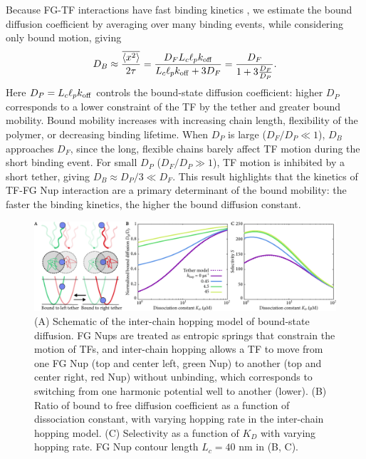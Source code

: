 Because FG-TF interactions have fast binding kinetics \cite{milles15,
  hough15}, we estimate the bound diffusion coefficient by averaging
over many binding events, while considering only bound motion, giving
\begin{equation}\label{eq:dbound}
  D_B \approx \frac{\overline{\langle x^2 \rangle}}{2\tau} = \frac{D_F L_c \ell_p
    k_{\mathrm{off}}}{L_c \ell_p k_{\mathrm{off}} + 3D_F} =
  \frac{D_F}{1+3\frac{D_F}{D_{P}}}.  
\end{equation}
Here $D_P = L_c \ell_p k_{\mathrm{off}}$ controls the bound-state diffusion
coefficient: higher $D_P$ corresponds to a lower constraint of the TF
by the tether and greater bound mobility. Bound mobility increases
with increasing chain length, flexibility of the polymer, or
decreasing binding lifetime. When $D_P$ is large ($D_F/D_P\ll1$),
$D_B$ approaches $D_F$, since the long, flexible chains barely affect
TF motion during the short binding event. For small $D_P$
($D_F/D_P\gg1$), TF motion is inhibited by a short tether, giving
$D_B\approx D_P/3\ll D_F$.  This result highlights that the kinetics
of TF-FG Nup interaction are a primary determinant of the bound
mobility: the faster the binding kinetics, the higher the bound
diffusion constant.

\begin{figure}
\centering
\includegraphics[width = \textwidth]{figs/ch02/fig4.pdf}
\caption{(A) Schematic of the inter-chain hopping model of bound-state
  diffusion. FG Nups are treated as entropic springs that constrain
  the motion of TFs, and inter-chain hopping allows a TF to move from
  one FG Nup (top and center left, green Nup) to another (top and
  center right, red Nup) without unbinding, which corresponds to
  switching from one harmonic potential well to another (lower). (B)
  Ratio of bound to free diffusion coefficient as a function of
  dissociation constant, with varying hopping rate in the inter-chain
  hopping model.  (C) Selectivity as a function of $K_D$ with varying
  hopping rate. FG Nup contour length $L_c = 40$ nm in (B, C). }
\label{fig:hopping}
\end{figure}


